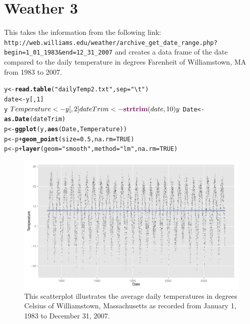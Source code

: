\documentclass{article}\usepackage{graphicx, color}
\makeatletter
\def\maxwidth{ %
  \ifdim\Gin@nat@width>\linewidth
    \linewidth
  \else
    \Gin@nat@width
  \fi
}
\newcommand{\hlfunctioncall}[1]{\textcolor[rgb]{0.501960784313725,0,0.329411764705882}{\textbf{#1}}}%
\newcommand{\hlstring}[1]{\textcolor[rgb]{0.6,0.6,1}{#1}}%
\newenvironment{kframe}{%
 \def\at@end@of@kframe{}%
 \ifinner\ifhmode%
  \def\at@end@of@kframe{\end{minipage}}%
  \begin{minipage}{\columnwidth}%
 \fi\fi%
 \def\FrameCommand##1{\hskip\@totalleftmargin \hskip-\fboxsep
 \colorbox{shadecolor}{##1}\hskip-\fboxsep
     \hskip-\linewidth \hskip-\@totalleftmargin \hskip\columnwidth}%
 \MakeFramed {\advance\hsize-\width
   \@totalleftmargin\z@ \linewidth\hsize
   \@setminipage}}%
 {\par\unskip\endMakeFramed%
 \at@end@of@kframe}
\newenvironment{knitrout}{}{} %
\makeatother
\begin{document}
\section*{Weather 3}
This takes the information from the following link:
 \verb+http://web.williams.edu/weather/archive_get_date_range.php?begin=1_01_1983&end=12_31_2007+
and creates a data frame of the date compared to the daily temperature
in degrees Farenheit of Williamstown, MA from 1983 to 2007.

\begin{knitrout}
\color{fgcolor}\begin{kframe}
\begin{alltt}
y <- \hlfunctioncall{read.table}(\hlstring{"dailyTemp2.txt"}, sep = \hlstring{"\textbackslash{}t"})
date <- y[, 1]
y$Temperature <- y[, 2]
dateTrim <- \hlfunctioncall{strtrim}(date, 10)
y$Date <- \hlfunctioncall{as.Date}(dateTrim)
p <- \hlfunctioncall{ggplot}(y, \hlfunctioncall{aes}(Date, Temperature))
p <- p + \hlfunctioncall{geom_point}(size = 0.5, na.rm = TRUE)
p <- p + \hlfunctioncall{layer}(geom = \hlstring{"smooth"}, method = \hlstring{"lm"}, na.rm = TRUE)
\end{alltt}
\end{kframe}
\end{knitrout}


\begin{landscape}
\begin{figure}
\begin{knitrout}
\color{fgcolor}
\includegraphics[width=\maxwidth]{figure/graph3Landscape} 

\end{knitrout}


\caption{This scatterplot illustrates the average daily temperatures in
  degrees Celsius of Williamstown, Massachusetts as recorded from
  January 1, 1983 to December 31, 2007.}
\end{figure}
\end{landscape}
\end{document}
